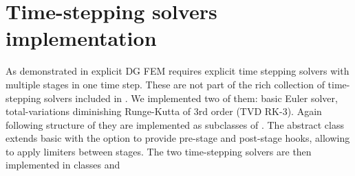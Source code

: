 \section{Time-stepping solvers implementation}
As demonstrated in  explicit DG FEM requires explicit time stepping solvers 
with multiple stages in one time step. These are not part of the rich collection of time-stepping 
solvers included in \sfepy{}. We implemented two of them: basic Euler solver, total-variations 
diminishing Runge-Kutta of 3rd order (TVD RK-3). Again following structure of \sfepy{} they are 
implemented as subclasses of . The abstract class 
 extends basic  with the option to provide 
pre-stage and post-stage hooks, allowing to apply limiters between stages. The two time-stepping 
solvers are then implemented in classes  and 

